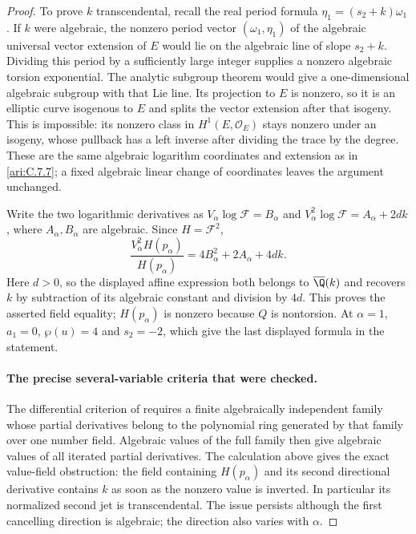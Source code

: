 \begin{proof}
To prove $k$ transcendental, recall the real period formula
$\eta_1=(s_2+k)\omega_1$. If $k$ were algebraic, the
nonzero period vector $(\omega_1,\eta_1)$ of the algebraic
universal vector extension of $E$ would lie on the algebraic
line of slope $s_2+k$. Dividing this period by a sufficiently
large integer supplies a nonzero algebraic torsion exponential.
The analytic subgroup theorem
\citep[Theorem 6.1]{huber2022} would give a one-dimensional
algebraic subgroup with that Lie line. Its projection to $E$
is nonzero, so it is an elliptic curve isogenous to $E$ and
splits the vector extension after that isogeny. This is
impossible: its nonzero class in $H^1(E,\mathcal O_E)$ stays
nonzero under an isogeny, whose pullback has a left inverse
after dividing the trace by the degree. These are the same
algebraic logarithm coordinates and extension as in \ref{ari:C.7.7};
a fixed algebraic linear change of coordinates leaves the
argument unchanged.

Write the two logarithmic derivatives as
$V_\alpha\log\mathcal F=B_\alpha$ and
$V_\alpha^2\log\mathcal F=A_\alpha+2dk$, where
$A_\alpha,B_\alpha$ are algebraic. Since $H=\mathcal F^2$,
\[
 \frac{V_\alpha^2H(p_\alpha)}{H(p_\alpha)}
       =4B_\alpha^2+2A_\alpha+4dk.
\]
Here $d>0$, so the displayed affine expression both belongs to
$\overline\Q(k)$ and recovers $k$ by subtraction of its algebraic
constant and division by $4d$. This proves the asserted field
equality; $H(p_\alpha)$ is nonzero because $Q$ is nontorsion.
At $\alpha=1$, $a_1=0$, $\wp(u)=4$ and $s_2=-2$,
which give the last displayed formula in the statement.


\paragraph{The precise several-variable criteria that were checked.}
The differential criterion of
\citet[Theorems 3.6 and 3.7]{waldschmidt2009auxiliary}
requires a finite algebraically independent family whose
partial derivatives belong to the polynomial ring generated
by that family over one number field. Algebraic values of
the full family then give algebraic values of all iterated
partial derivatives. The calculation above gives the exact value-field obstruction:
the field containing $H(p_\alpha)$ and its second directional
derivative contains $k$ as soon as the nonzero value is inverted.
In particular its normalized second jet is transcendental. The issue persists
although the first cancelling direction is algebraic; the
direction also varies with $\alpha$.


\end{proof}
